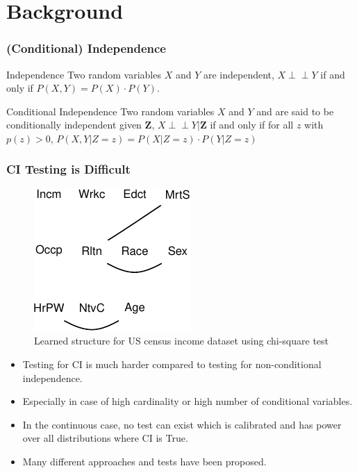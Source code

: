 \documentclass{beamer}
\def\ci{\perp\!\!\!\!\!\perp}
\begin{document}
\section{Background}
\begin{frame}
	\frametitle{(Conditional) Independence}
	\begin{block}{Independence}
		Two random variables $ X $ and $ Y $ are independent,
		$ X \ci Y $ if and only if $ P(X, Y) = P(X) \cdot P(Y) $.
	\end{block}
	\vspace{1em}

	\begin{block}{Conditional Independence}
		Two random variables $ X $ and $ Y $ and are said to be
		conditionally independent given $ \bm{Z} $, $ X \ci Y | \bm{Z}
		$ if and only if for all $ z $ with $ p(z) > 0 $, $ P(X, Y |
		Z=z) = P(X | Z=z) \cdot P(Y | Z=z) $
	\end{block}
\end{frame}

\begin{frame}
	\frametitle{CI Testing is Difficult}
	\begin{figure}
		\centering
		\includegraphics[scale=0.7]{imgs/sl-adult-mi-crop.pdf}
		\caption*{Learned structure for US census income dataset using chi-square test}
	\end{figure}
	\begin{itemize}
		\item Testing for CI is much harder compared to testing for
			non-conditional independence.
		\item Especially in case of high cardinality or high number of
			conditional variables.
		\item In the continuous case, no test can exist which is calibrated and
			has power over all distributions where CI is True. \footnotemark
		\item Many different approaches and tests have been proposed.
	\end{itemize}

\end{frame}
\end{document}

